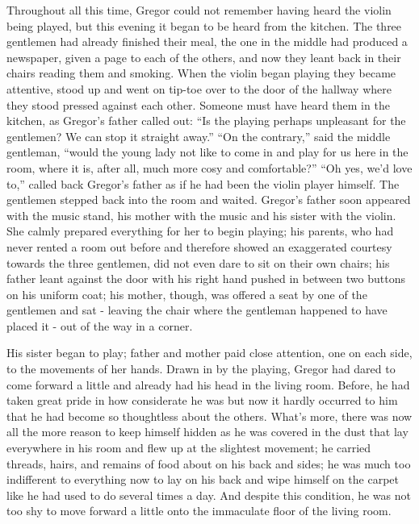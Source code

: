 \documentclass[12pt]{report}
\begin{document}
Throughout all this time, Gregor could not remember having heard the
violin being played, but this evening it began to be heard from the
kitchen. The three gentlemen had already finished their meal, the one in
the middle had produced a newspaper, given a page to each of the others,
and now they leant back in their chairs reading them and smoking. When
the violin began playing they became attentive, stood up and went on
tip-toe over to the door of the hallway where they stood pressed against
each other. Someone must have heard them in the kitchen, as Gregor's
father called out: ``Is the playing perhaps unpleasant for the
gentlemen? We can stop it straight away.'' ``On the contrary,'' said the
middle gentleman, ``would the young lady not like to come in and play
for us here in the room, where it is, after all, much more cosy and
comfortable?'' ``Oh yes, we'd love to,'' called back Gregor's father as
if he had been the violin player himself. The gentlemen stepped back
into the room and waited. Gregor's father soon appeared with the music
stand, his mother with the music and his sister with the violin. She
calmly prepared everything for her to begin playing; his parents, who
had never rented a room out before and therefore showed an exaggerated
courtesy towards the three gentlemen, did not even dare to sit on their
own chairs; his father leant against the door with his right hand pushed
in between two buttons on his uniform coat; his mother, though, was
offered a seat by one of the gentlemen and sat - leaving the chair where
the gentleman happened to have placed it - out of the way in a corner.

His sister began to play; father and mother paid close attention, one on
each side, to the movements of her hands. Drawn in by the playing,
Gregor had dared to come forward a little and already had his head in
the living room. Before, he had taken great pride in how considerate he
was but now it hardly occurred to him that he had become so thoughtless
about the others. What's more, there was now all the more reason to keep
himself hidden as he was covered in the dust that lay everywhere in his
room and flew up at the slightest movement; he carried threads, hairs,
and remains of food about on his back and sides; he was much too
indifferent to everything now to lay on his back and wipe himself on the
carpet like he had used to do several times a day. And despite this
condition, he was not too shy to move forward a little onto the
immaculate floor of the living room.
\end{document}
